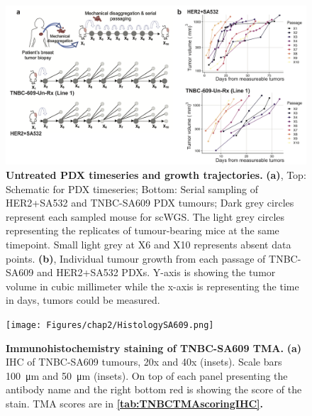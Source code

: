 


 \begin{figure}
\centering
\includegraphics[width=\textwidth]{Figures/chap4/Untreatedgrowthcurves.png}
	
\caption[Untreated PDX timeseries and growth trajectories]
	{\small
	\textbf{Untreated PDX timeseries and growth trajectories.}
	    \textbf{(a)}, Top: Schematic for PDX timeseries; Bottom: Serial sampling of HER2+SA532 and TNBC-SA609 PDX tumours;
Dark grey circles represent each sampled mouse for scWGS. The light grey circles representing the replicates of tumour-bearing mice at the same timepoint. Small light grey at X6 and X10 represents absent data points.
	    \textbf{(b)}, Individual tumour growth from each passage of TNBC-SA609 and HER2+SA532 PDXs. Y-axis is showing the tumor volume in cubic millimeter while the x-axis is representing the time in days, tumors could be measured.}
	\label{fig:Untreatedgrowthcurves}
\end{figure}

 \begin{figure}
\centering
\texttt{[image: Figures/chap2/HistologySA609.png]}
	
\caption[]
	{\small
\textbf{Immunohistochemistry staining of TNBC-SA609 TMA.}
 \textbf{(a)} IHC of TNBC-SA609 tumours, 20x and 40x (insets). Scale bars \SI{100}{\micro\metre} and \SI{50}{\micro\metre} (insets). On top of each panel presenting the antibody name and the right bottom red is showing the score of the stain. TMA scores are in \textbf{\autoref{tab:TNBCTMAscoringIHC}.}}
	\label{fig:HistologySA609}
\end{figure}

